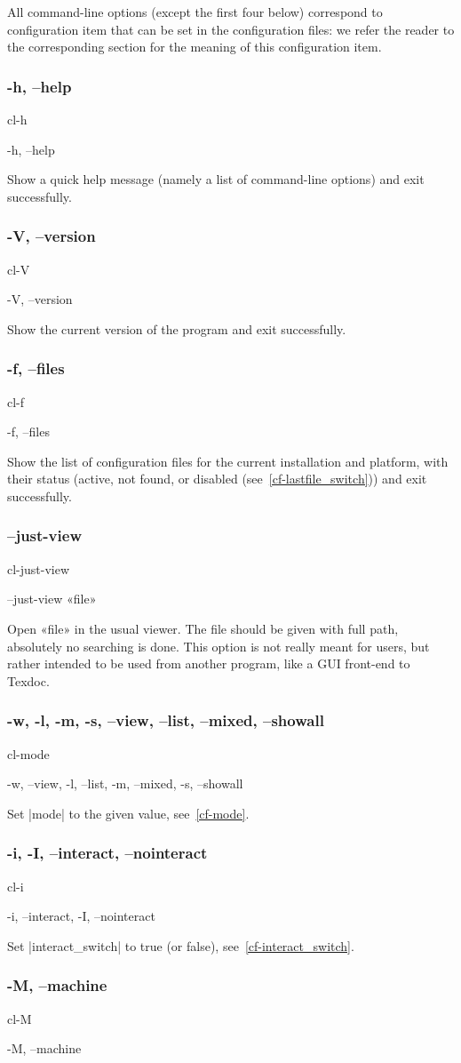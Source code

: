 \documentclass[a4paper, oneside]{scrartcl}
\newif\ifframed
\newenvironment{cmdsubsub}[2]{%
  \framedfalse \commandes\subsubsection{#1}{#2}%
  }{%
  \endcommandes}
\begin{document}
All command-line options (except the first four below) correspond to
configuration item that can be set in the configuration files: we refer
the reader to the corresponding section for the meaning of this configuration
item.

\begin{cmdsubsub}{-h, --help}{cl-h}
  -h, --help
\end{cmdsubsub}

Show a quick help message (namely a list of command-line options) and exit
successfully.

\begin{cmdsubsub}{-V, --version}{cl-V}
  -V, --version
\end{cmdsubsub}

Show the current version of the program and exit successfully.

\begin{cmdsubsub}{-f, --files}{cl-f}
  -f, --files
\end{cmdsubsub}

Show the list of configuration files for the current installation and
platform, with their status (active, not found, or disabled
(see~\ref{cf-lastfile_switch})) and exit successfully.

\begin{cmdsubsub}{--just-view}{cl-just-view}
  --just-view «file»
\end{cmdsubsub}

Open «file» in the usual viewer. The file should be given with full path,
absolutely no searching is done. This option is not really meant for users,
but rather intended to be used from another program, like a GUI front-end to
Texdoc.

\begin{cmdsubsub}{-w, -l, -m, -s, --view, --list, --mixed, --showall}{cl-mode}
  -w, --view, -l, --list, -m, --mixed, -s, --showall
\end{cmdsubsub}

Set |mode| to the given value, see~\ref{cf-mode}.

\begin{cmdsubsub}{-i, -I, --interact, --nointeract}{cl-i}
  -i, --interact, -I, --nointeract
\end{cmdsubsub}

Set |interact_switch| to true (or false), see~\ref{cf-interact_switch}.

\begin{cmdsubsub}{-M, --machine}{cl-M}
  -M, --machine
\end{cmdsubsub}
\end{document}
